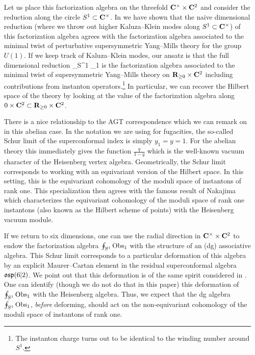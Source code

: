 Let us place this factorization algebra on the threefold $\mathbf{C}^\times \times \mathbf{C}^2$ and consider the reduction along the circle $S^1 \subset \mathbf{C}^\times$. 
In \cite{SWtensor} we have shown that the naive dimensional reduction (where we throw out higher Kaluza--Klein modes along $S^1 \subset \mathbf{C}^\times$) of this factorization algebra agrees with the factorization algebra associated to the minimal twist of perturbative supersymmetric Yang--Mills theory for the group $U(1)$. 
If we keep track of Kaluza--Klein modes, our ansatz is that the full dimensional reduction 
\beqn
\oint_{S^1} \Obs_1
\eeqn
is the factorization algebra associated to the minimal twist of supersymmetric Yang--Mills theory on $\mathbf{R}_{\geq 0} \times \mathbf{C}^2$ including contributions from instanton operators.\footnote{The instanton charge turns out to be identical to the winding number around $S^1$.}
In particular, we can recover the Hilbert space of the theory by looking at the value of the factorization algebra along $0 \times \mathbf{C}^2 \subset \mathbf{R}_{\geq 0} \times \mathbf{C}^2$.

There is a nice relationship to the AGT correspondence which we can remark on in this abelian case. 
In the notation we are using for fugacities, the so-called Schur limit of the superconformal index is simply $y_1=y=1$.
For the abelian theory this immediately gives the function $\frac{q}{1-q}$ which is the well-known vacuum character of the Heisenberg vertex algebra. 
Geometrically, the Schur limit corresponds to working with an equivariant version of the Hilbert space.
In this setting, this is the equivariant cohomology of the moduli space of instantons of rank one.
This specialization then agrees with the famous result of Nakajima which characterizes the equivariant cohomology of the moduli space of rank one instantons (also known as the Hilbert scheme of points) with the Heisenberg vacuum module.

If we return to six dimensions, one can use the radial direction in $\mathbf{C}^\times \times \mathbf{C}^2$ to endow the factorization algebra $\oint_{S^1} \operatorname{Obs}_1$ with the structure of an (dg) associative algebra. 
This Schur limit corresponds to a particular deformation of this algebra by an explicit Maurer--Cartan element in the residual superconformal algebra $\mathfrak{osp}(6|2)$.
We point out that this deformation is of the same spirit considered in \cite{BeemEtAl}.
One can identify (though we do not do that in this paper) this deformation of $\oint_{S^1} \operatorname{Obs}_1$ with the Heisenberg algebra. 
Thus, we expect that the dg algebra $\oint_{S^1} \operatorname{Obs}_1$, {\em before} deforming, should act on the non-equivariant cohomology of the moduli space of instantons of rank one.

